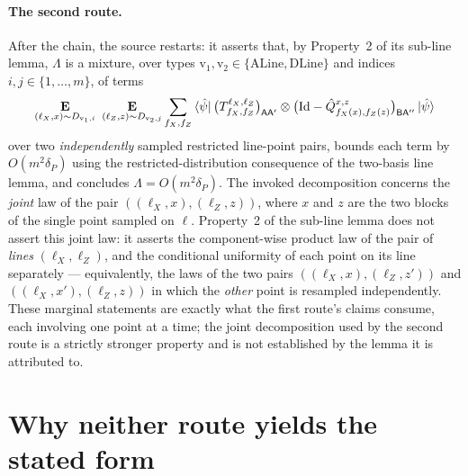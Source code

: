 \documentclass[11pt]{article}
\newcommand{\Id}{\mathrm{Id}}
\begin{document}
\paragraph{The second route.}
After the chain, the source restarts: it asserts that, by Property~2 of
its sub-line lemma, $\Lambda$ is a mixture, over types
$\mathrm{v}_1, \mathrm{v}_2 \in \{\mathrm{ALine}, \mathrm{DLine}\}$ and
indices $i, j \in \{1, \dots, m\}$, of terms
\begin{equation*}
  \E_{(\ell_X, x) \sim D_{\mathrm{v}_1,i}}\
  \E_{(\ell_Z, z) \sim D_{\mathrm{v}_2,j}}
  \sum_{f_X,f_Z} \bra{\hat\psi}
  \big(T^{\ell_X,\ell_Z}_{f_X,f_Z}\big)_{\mathsf{A}\mathsf{A}'} \ot
  \big(\Id - \hat{Q}^{x,z}_{f_X(x),f_Z(z)}\big)_{\mathsf{B}\mathsf{A}''}
  \ket{\hat\psi}
\end{equation*}
over two \emph{independently} sampled restricted line-point pairs,
bounds each term by $O(m^2\delta_P)$ using the restricted-distribution
consequence of the two-basis line lemma, and concludes
$\Lambda = O(m^2\delta_P)$.  The invoked decomposition concerns the
\emph{joint} law of the pair $((\ell_X, x), (\ell_Z, z))$, where $x$ and
$z$ are the two blocks of the single point sampled on $\ell$.  Property~2
of the sub-line lemma does not assert this joint law: it asserts the
component-wise product law of the pair of \emph{lines}
$(\ell_X, \ell_Z)$, and the conditional uniformity of each point on its
line separately --- equivalently, the laws of the two pairs
$((\ell_X, x), (\ell_Z, z'))$ and $((\ell_X, x'), (\ell_Z, z))$ in which
the \emph{other} point is resampled independently.  These marginal
statements are exactly what the first route's claims consume, each
involving one point at a time; the joint decomposition used by the
second route is a strictly stronger property and is not established by
the lemma it is attributed to.

\section{Why neither route yields the stated form}
\end{document}
